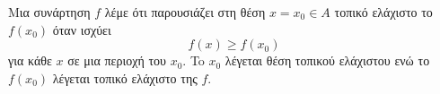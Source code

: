 Μια συνάρτηση $ f $ λέμε ότι παρουσιάζει στη θέση $ x=x_0\in A $ τοπικό ελάχιστο το $ f(x_0) $ όταν ισχύει
\[ f(x)\geq f(x_0) \]
για κάθε $ x $ σε μια περιοχή του $ x_0 $. To $ x_0 $ λέγεται θέση τοπικού ελάχιστου ενώ το $ f(x_0) $ λέγεται τοπικό ελάχιστο της $ f $.

